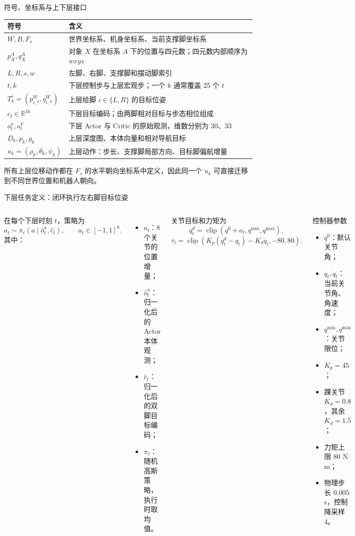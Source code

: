 \documentclass[aspectratio=169,10pt]{beamer}
\begin{document}
\begin{frame}{符号、坐标系与上下层接口}
\small
\begin{tabular}{p{}p{}}
\toprule
符号 & 含义\\
\midrule
$W,B,F_s$ & 世界坐标系、机身坐标系、当前支撑脚坐标系\\
$p^A_X,q^A_X$ & 对象 $X$ 在坐标系 $A$ 下的位置与四元数；四元数内部顺序为 $wxyz$\\
$L,R,s,w$ & 左脚、右脚、支撑脚和摆动脚索引\\
$t,k$ & 下层控制步与上层宏观步；一个 $k$ 通常覆盖 25 个 $t$\\
$T^i_k=(p^W_{i,*},q^W_{i,*})$ & 上层给脚 $i\in\{L,R\}$ 的目标位姿\\
$c_t\in\mathbb{R}^{16}$ & 下层目标编码；由两脚相对目标与步态相位组成\\
$o_t^\pi,o_t^V$ & 下层 Actor 与 Critic 的原始观测，维数分别为 30、33\\
$D_k,p_k,g_k$ & 上层深度图、本体向量和相对导航目标\\
$u_k=(\rho_k,\theta_k,\psi_k)$ & 上层动作：步长、支撑脚局部方向、目标脚偏航增量\\
\bottomrule
\end{tabular}
\vspace{0.5em}
所有上层位移动作都在 $F_s$ 的水平朝向坐标系中定义，因此同一个 $u_k$ 可直接迁移到不同世界位置和机器人朝向。
\end{frame}

\begin{frame}{下层任务定义：闭环执行左右脚目标位姿}
\begin{columns}[T,onlytextwidth]
在每个下层时刻 $t$，策略为
\[
 a_t\sim\pi_\ell(a\mid \hat o_t^\pi,\hat c_t),\qquad a_t\in[-1,1]^8 .
\]
其中：
\begin{itemize}
  \item $a_t$：8 个关节的位置增量；
  \item $\hat o_t^\pi$：归一化后的 Actor 本体观测；
  \item $\hat c_t$：归一化后的双脚目标编码；
  \item $\pi_\ell$：随机高斯策略，执行时取均值。
\end{itemize}
关节目标和力矩为
\[
q_t^d=\operatorname{clip}(q^0+a_t,q^{\min},q^{\max}),
\]
\[
\tau_t=\operatorname{clip}\!\left(K_p(q_t^d-q_t)-K_d\dot q_t,-80,80\right).
\]
\begin{block}{控制器参数}
\begin{itemize}
  \item $q^0$：默认关节角；
  \item $q_t,\dot q_t$：当前关节角、角速度；
  \item $q^{\min},q^{\max}$：关节限位；
  \item $K_p=45$；
  \item 踝关节 $K_d=0.8$，其余 $K_d=1.5$；
  \item 力矩上限 $80$ N$\cdot$m；
  \item 物理步长 0.005 s，控制降采样 4。
\end{itemize}
\end{block}
\end{columns}
\end{frame}
\end{document}

